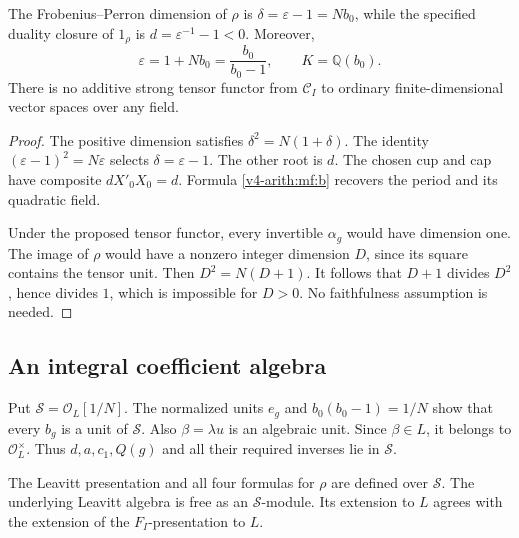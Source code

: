 \begin{proposition}\label{v4-arith:mf:dimension}
The Frobenius--Perron dimension of \(\rho\) is
\(\delta=\varepsilon-1=Nb_0\), while the specified duality
closure of \(1_\rho\) is \(d=\varepsilon^{-1}-1<0\).
Moreover,
\[
 \varepsilon=1+Nb_0=\frac{b_0}{b_0-1},\qquad
 K=\mathbb Q(b_0).
\]
There is no additive strong tensor functor from \(\mathcal C_I\)
to ordinary finite-dimensional vector spaces over any field.
\end{proposition}

\begin{proof}
The positive dimension satisfies \(\delta^2=N(1+\delta)\).
The identity \((\varepsilon-1)^2=N\varepsilon\)
selects \(\delta=\varepsilon-1\).
The other root is \(d\).
The chosen cup and cap have composite \(dX'_0X_0=d\).
Formula \eqref{v4-arith:mf:b} recovers the period and its
quadratic field.

Under the proposed tensor functor, every invertible \(\alpha_g\)
would have dimension one.
The image of \(\rho\) would have a nonzero integer dimension \(D\),
since its square contains the tensor unit.
Then \(D^2=N(D+1)\).
It follows that \(D+1\) divides \(D^2\), hence divides \(1\),
which is impossible for \(D>0\).
No faithfulness assumption is needed.
\end{proof}


\subsection{An integral coefficient algebra}

Put \(\mathcal S=\mathcal O_L[1/N]\).
The normalized units \(e_g\) and
\(b_0(b_0-1)=1/N\) show that every \(b_g\) is a unit of
\(\mathcal S\). Also \(\beta=\lambda u\) is an algebraic unit.
Since \(\beta\in L\), it belongs to \(\mathcal O_L^\times\).
Thus \(d,a,c_1,Q(g)\) and all their required inverses lie in
\(\mathcal S\).

\begin{proposition}\label{v4-arith:mf:integral}
The Leavitt presentation and all four formulas for \(\rho\)
are defined over \(\mathcal S\).
The underlying Leavitt algebra is free as an \(\mathcal S\)-module.
Its extension to \(L\) agrees with the extension of the
\(F_I\)-presentation to \(L\).
\end{proposition}


